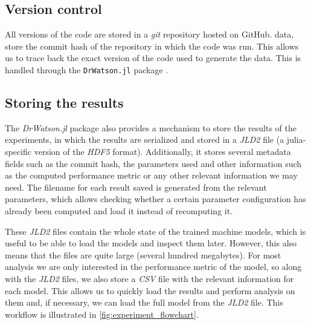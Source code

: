 \subsection{Version control}

All versions of the code are stored in a \emph{git} repository hosted on GitHub.
data, store the commit hash of the repository in which the code was run. This
allows us to trace back the exact version of the code used to generate the data.
This is handled through the \texttt{DrWatson.jl} package
\cite{datserisDrWatsonPerfectSidekick2020a}.

\subsection{Storing the results}

The \emph{DrWatson.jl} package also provides a mechanism to store the results of
the experiments, in which the results are serialized and stored in a \emph{JLD2}
file (a julia-specific version of the \emph{HDF5} format). Additionally, it
stores several metadata fields such as the commit hash, the parameters used and
other information such as the computed performance metric or any other relevant
information we may need. The filename for each result saved is generated from
the relevant parameters, which allows checking whether a certain parameter
configuration has already been computed and load it instead of recomputing it.

These \emph{JLD2} files contain the whole state of the trained machine models,
which is useful to be able to load the models and inspect them later. However,
this also means that the files are quite large (several hundred megabytes). For
most analysis we are only interested in the performance metric of the model, so
along with the \emph{JLD2} files, we also store a \emph{CSV} file with the
relevant information for each model. This allows us to quickly load the results
and perform analysis on them and, if necessary, we can load the full model from
the \emph{JLD2} file. This workflow is illustrated in
\cref{fig:experiment_flowchart}.

